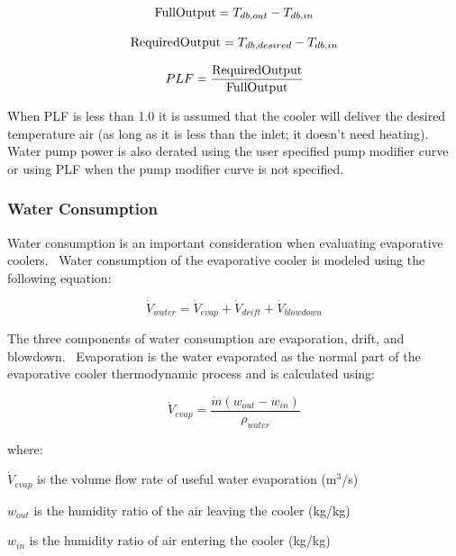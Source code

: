 \begin{equation}
{\rm{FullOutput}} = {T_{db,out}} - {T_{db,in}}
\label{eq:IECFullOutput}
\end{equation}

\begin{equation}
{\rm{RequiredOutput}} = {T_{db,desired}} - {T_{db,in}}
\label{eq:IECRequiredOutput}
\end{equation}

\begin{equation}
PLF = \frac{{{\rm{RequiredOutput}}}}{{{\rm{FullOutput}}}}
\label{eq:IECPLF}
\end{equation}

When PLF is less than 1.0 it is assumed that the cooler will deliver the desired temperature air (as long as it is less than the inlet; it doesn't need heating).~ Water pump power is also derated using the user specified pump modifier curve or using PLF when the pump modifier curve is not specified.

\subsubsection{Water Consumption}\label{water-consumption-1}

Water consumption is an important consideration when evaluating evaporative coolers.~ Water consumption of the evaporative cooler is modeled using the following equation:

\begin{equation}
{\dot V_{water}} = {\dot V_{evap}} + {\dot V_{drift}} + {\dot V_{blowdown}}
\end{equation}

The three components of water consumption are evaporation, drift, and blowdown.~ Evaporation is the water evaporated as the normal part of the evaporative cooler thermodynamic process and is calculated using:

\begin{equation}
{\dot V_{evap}} = \frac{{\dot m\left( {{w_{out}} - {w_{in}}} \right)}}{{{\rho_{water}}}}
\end{equation}

where:

\({\dot V_{evap}}\) is the volume flow rate of useful water evaporation (m\(^{3}\)/s)

\({w_{out}}\) is the humidity ratio of the air leaving the cooler (kg/kg)

\({w_{in}}\) is the humidity ratio of air entering the cooler (kg/kg)

